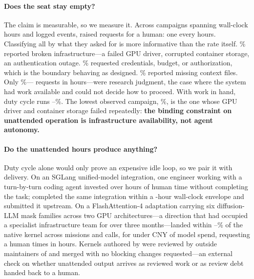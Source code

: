 \paragraph{Does the seat stay empty?}
The claim is measurable, so we measure it. Across \DutyCampaigns{} campaigns
spanning \DutyWallHours{} wall-clock hours and \DutyEvents{} logged events,
\systemname raised \DutyInterruptions{} requests for a human: one every
\DutyInterval{} hours. Classifying all \DutyInterruptions{} by what they asked for is
more informative than the rate itself. \DutyInfraPercent\% reported broken
infrastructure---a failed GPU driver, corrupted container storage, an authentication
outage. \DutyAuthorityPercent\% requested credentials, budget, or authorization,
which is the boundary behaving as designed. \DutyContextPercent\% reported missing
context files. Only \DutyJudgmentPercent\%---\DutyJudgmentCount{} requests in
\DutyWallHours{} hours---were research judgment, the case where the system had work
available and could not decide how to proceed. With work in hand, duty cycle runs
\DutyCycleLow--\DutyCycleHigh\%. The lowest observed campaign,
\DutyDegradedCycle\%, is the one whose GPU driver and container storage failed
repeatedly: \textbf{the binding constraint on unattended operation is infrastructure
availability, not agent autonomy.}

\paragraph{Do the unattended hours produce anything?}
Duty cycle alone would only prove an expensive idle loop, so we pair it with
delivery. On an SGLang unified-model integration, one engineer working with a
turn-by-turn coding agent invested over \SGLangHumanHours{} hours of human time
without completing the task; \systemname completed the same integration within a
\SGLangArgusHours{}-hour wall-clock envelope and submitted it upstream. On a
FlashAttention-4 adaptation carrying six diffusion-LLM mask families across two GPU
architectures---a direction that had occupied a specialist infrastructure team for
over three months---\systemname landed within \FlashDAGapLow--\FlashDAGapHigh\% of
the native kernel across \FlashDAMissions{} missions and \FlashDACalls{} calls, for
under \FlashDACostCNY{} CNY of model spend, requesting a human
\FlashDAInterrupts{} times in \FlashDASpan{} hours. Kernels authored by
\systemname{} were reviewed by outside maintainers of 
and merged with no blocking changes requested---an external check on whether
unattended output arrives as reviewed work or as review debt handed back to a human.

